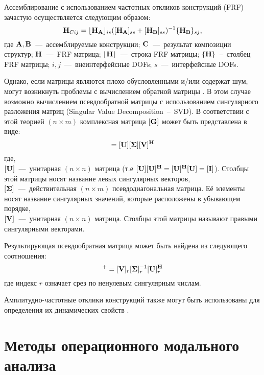 Ассемблирование с использованием частотных откликов конструкций (FRF) зачастую осуществляется следующим образом:
\begin{equation*}
	\mathbf{H}_{Cij} = \lfloor \mathbf{H}_{\mathbf{A}} \rfloor_{is} ([\mathbf{H}_{\mathbf{A}}]_{ss} + [\mathbf{H}_{\mathbf{B}}]_{ss})^{-1} \{ \mathbf{H}_{\mathbf{B}} \}_{sj},
\end{equation*}
где $\mathbf{A}, \mathbf{B}$~---~ассемблируемые конструкции; $\mathbf{C}$~---~результат композиции структур; $\mathbf{H}$~---~FRF матрица; $\lfloor \mathbf{H} \rfloor$~---~строка FRF матрицы; $\{ \mathbf{H} \}$~--~столбец FRF матрицы; $ i, j $~---~внеинтерфейсные DOFs; $ s $~---~интерфейсные DOFs.

Однако, если матрицы являются плохо обусловленными и/или содержат шум, могут возникнуть проблемы с вычислением обратной матрицы \cite{lib:coupling:Gialamas}. В этом случае возможно вычислением псевдообратной матрицы с использованием сингулярного разложения матриц (Singular Value Decomposition~--~SVD). В соответствии с этой теорией $ (n \times m) $ комплексная матрица $ [\mathbf{G}] $ может быть представлена в виде:
\begin{equation}
	[\mat{G}] = [\mat{U}][\mat{\Sigma}][\mat{V}] ^ \mat{H}
\end{equation}
где, \\
$ [\mathbf{U}] $~---~унитарная $(n \times n)$ матрица (т.е $ [\mathbf{U}][\mathbf{U}] ^ {\mathbf{H}} = [\mathbf{U}] ^ {\mathbf{H}}[\mathbf{U}] = [\mathbf{I}] $). Столбцы этой матрицы носят название левых сингулярных векторов, \\
$[\mathbf{\Sigma}]$~---~действительная $(n \times m)$ псевдодиагональная матрица. Её элементы носят название сингулярных значений, которые расположены в убывающем порядке,\\
$[\mathbf{V}]$~---~унитарная ${(n \times n)}$ матрица. Столбцы этой матрицы называют правыми сингулярными векторами. 

Результирующая псевдообратная матрица может быть найдена из следующего соотношения:
\begin{equation}
	[\mat{G}]^{+} = [\mat{V}]_r [\mat{\Sigma}]_r ^ {-1} [\mat{U}]_r ^ \mat{H}
\end{equation}
где индекс $ r $ означает срез по ненулевым сингулярным числам.

Амплитудно-частотные отклики конструкций также могут быть использованы для определения их динамических свойств \cite{lib:coupling:Xi, lib:coupling:Malekjafarian}.

\section{Методы операционного модального анализа}

